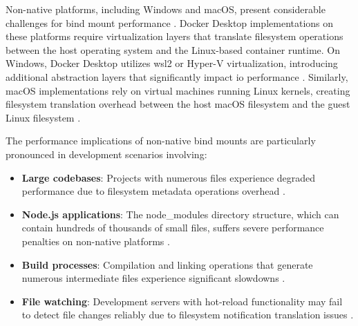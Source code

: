 Non-native platforms, including Windows and macOS, present considerable challenges for bind mount performance \citep{dockerDockerDesktopWSL2020,cncfDockerMacOSSlow2023}.
Docker Desktop implementations on these platforms require virtualization layers that translate filesystem operations between the host operating system and the Linux-based container runtime.
On Windows, Docker Desktop utilizes \ac{wsl}2 or Hyper-V virtualization, introducing additional abstraction layers that significantly impact \ac{io} performance \citep{dockerDockerDesktopWSL2020}.
Similarly, macOS implementations rely on virtual machines running Linux kernels, creating filesystem translation overhead between the host macOS filesystem and the guest Linux filesystem \citep{cncfDockerMacOSSlow2023}.

The performance implications of non-native bind mounts are particularly pronounced in development scenarios involving:
\begin{itemize}
    \item \textbf{Large codebases}: Projects with numerous files experience degraded performance due to filesystem metadata operations overhead \citep{dockerDockerDesktopWSL2020}.
    \item \textbf{Node.js applications}: The node\_modules directory structure, which can contain hundreds of thousands of small files, suffers severe performance penalties on non-native platforms \citep{cncfDockerMacOSSlow2023}.
    \item \textbf{Build processes}: Compilation and linking operations that generate numerous intermediate files experience significant slowdowns \citep{cncfDockerMacOSSlow2023}.
    \item \textbf{File watching}: Development servers with hot-reload functionality may fail to detect file changes reliably due to filesystem notification translation issues \citep{kolyasnikovExperimentalEvaluationVirtual2019}.
\end{itemize}

